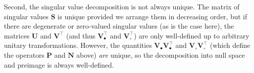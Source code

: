 \documentclass[modern]{aastex62}
\begin{document}
Second, the singular value decomposition is not always unique. The
matrix of singular values $\mathbf{S}$ is unique provided we arrange
them in decreasing order, but if there are degenerate or zero-valued
singular values (as is the case here), the matrices $\mathbf{U}$ and
$\mathbf{V}^\top$ (and thus $\mathbf{V}^\top_\bullet$ and $\mathbf{V}^\top_\circ$)
are only well-defined up to arbitrary unitary
transformations. However, the quantities
$\mathbf{V}_\bullet\mathbf{V}^\top_\bullet$
and
$\mathbf{V}_\circ\mathbf{V}^\top_\circ$
(which define the operators $\mathbf{P}$ and $\mathbf{N}$ above) \emph{are}
unique, so the decomposition into null space and preimage is always well-defined.
\end{document}
